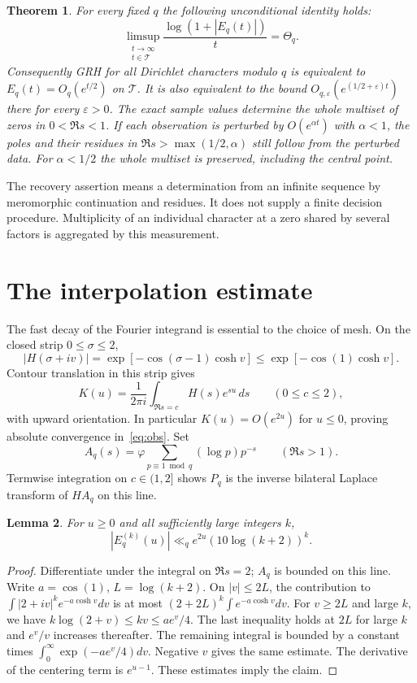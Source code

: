 \documentclass[11pt]{article}
\newtheorem{theorem}{Theorem}[section]
\newtheorem{lemma}[theorem]{Lemma}
\newcommand{\eps}{\varepsilon}
\begin{document}
\begin{theorem}\label{thm:main}
For every fixed $q$ the following unconditional identity holds:
\[
 \limsup_{\substack{t\to\infty\\t\in\mathcal T}}
       \frac{\log(1+|E_q(t)|)}{t}=\Theta_q .
\]
Consequently GRH for all Dirichlet characters modulo $q$ is equivalent to $E_q(t)=O_q(e^{t/2})$ on $\mathcal T$. It is also equivalent to the bound $O_{q,\eps}(e^{(1/2+\eps)t})$ there for every $\eps>0$. The exact sample values determine the whole multiset of zeros in $0<\Re s<1$. If each observation is perturbed by $O(e^{\alpha t})$ with $\alpha<1$, the poles and their residues in $\Re s>\max(1/2,\alpha)$ still follow from the perturbed data. For $\alpha<1/2$ the whole multiset is preserved, including the central point.
\end{theorem}

The recovery assertion means a determination from an infinite sequence by meromorphic continuation and residues. It does not supply a finite decision procedure. Multiplicity of an individual character at a zero shared by several factors is aggregated by this measurement.

\section{The interpolation estimate}

The fast decay of the Fourier integrand is essential to the choice of mesh. On the closed strip $0\le\sigma\le2$,
\[
 |H(\sigma+iv)|=\exp[-\cos(\sigma-1)\cosh v]
           \le\exp[-\cos(1)\cosh v].
\]
Contour translation in this strip gives
\[
 K(u)=\frac{1}{2\pi i}\int_{\Re s=c}H(s)e^{su}\,ds
 \qquad(0\le c\le2),
\]
with upward orientation. In particular $K(u)=O(e^{2u})$ for $u\le0$, proving absolute convergence in~\eqref{eq:obs}. Set
\[
 A_q(s)=\varphi\sum_{p\equiv1\bmod q}(\log p)p^{-s}
 \qquad (\Re s>1).
\]
Termwise integration on $c\in(1,2]$ shows $P_q$ is the inverse bilateral Laplace transform of $H A_q$ on this line.

\begin{lemma}\label{lem:derivative}
For $u\ge0$ and all sufficiently large integers $k$,
\[
 |E_q^{(k)}(u)|\ll_q e^{2u}(10\log(k+2))^k .
\]
\end{lemma}
\begin{proof}
Differentiate under the integral on $\Re s=2$; $A_q$ is bounded on this line. Write $a=\cos(1)$, $L=\log(k+2)$. On $|v|\le2L$, the contribution to $\int |2+iv|^k e^{-a\cosh v}dv$ is at most $(2+2L)^k\int e^{-a\cosh v}dv$. For $v\ge 2L$ and large $k$, we have $k\log(2+v)\le kv\le ae^v/4$. The last inequality holds at $2L$ for large $k$ and $e^v/v$ increases thereafter. The remaining integral is bounded by a constant times $\int_0^\infty\exp(-ae^v/4)dv$. Negative $v$ gives the same estimate. The derivative of the centering term is $e^{u-1}$. These estimates imply the claim.
\end{proof}
\end{document}
